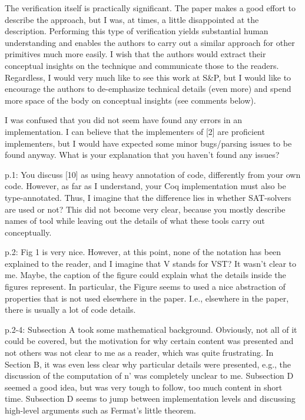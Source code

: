 The verification itself is practically significant. The paper makes a good
effort to describe the approach, but I was, at times, a little disappointed at
the description. Performing this type of verification yields substantial human
understanding and enables the authors to carry out a similar approach for other
primitives much more easily. I wish that the authors would extract their conceptual
insights on the technique and communicate those to the readers. Regardless, I
would very much like to see this work at S\&P, but I would like to encourage the
authors to de-emphasize technical details (even more) and spend more space of
the body on conceptual insights (see comments below).


\begin{center}
\end{center}

I was confused that you did not seem have found any errors in an implementation.
I can believe that the implementers of [2] are proficient implementers, but I
would have expected some minor bugs/parsing issues to be found anyway. What is
your explanation that you haven't found any issues?

p.1: You discuss [10] as using heavy annotation of code, differently from your
own code. However, as far as I understand, your Coq implementation must also be
type-annotated. Thus, I imagine that the difference lies in whether SAT-solvers
are used or not? This did not become very clear, because you mostly describe
names of tool while leaving out the details of what these tools carry out
conceptually.

p.2: Fig 1 is very nice. However, at this point, none of the notation has been
explained to the reader, and I imagine that V stands for VST? It wasn't clear to
me. Maybe, the caption of the figure could explain what the details inside the
figures represent. In particular, the Figure seems to used a nice abstraction of
properties that is not used elsewhere in the paper. I.e., elsewhere in the paper,
there is usually a lot of code details.

p.2-4: Subsection A took some mathematical background. Obviously, not all of it
could be covered, but the motivation for why certain content was presented and
not others was not clear to me as a reader, which was quite frustrating. In
Section B, it was even less clear why particular details were presented, e.g.,
the discussion of the computation of n' was completely unclear to me.
Subsection D seemed a good idea, but was very tough to follow, too much content
in short time. Subsection D seems to jump between implementation levels and
discussing high-level arguments such as Fermat's little theorem.

